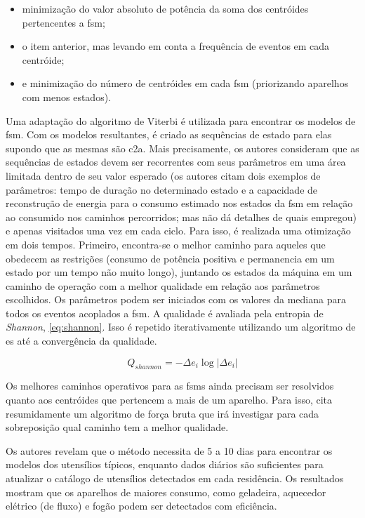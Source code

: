 \begin{enumerate}[label=\textbf{1.\arabic*},wide=\parindent]
\begin{enumerate}[label*=.\textbf{\arabic*},wide=\parindent]
\begin{itemize}[wide=\parindent]
\begin{itemize}
\item minimização do valor absoluto de potência da soma dos
centróides pertencentes a \gls{fsm}; 
\item o item anterior, mas levando em conta a frequência de
eventos em cada centróide; 
\item e minimização do número de centróides em
cada \gls{fsm} (priorizando aparelhos com menos estados).
\end{itemize}

Uma adaptação do algoritmo de Viterbi é utilizada para encontrar os
modelos de \gls{fsm}. Com os modelos resultantes, é criado as
sequências de estado para elas supondo que as mesmas são \gls{c2a}.
Mais precisamente, os autores consideram que as sequências de estados
devem ser recorrentes com seus parâmetros em uma área limitada dentro
de seu valor esperado (os autores citam dois exemplos de parâmetros:
tempo de duração no determinado estado e a capacidade de reconstrução
de energia para o consumo estimado nos estados da \gls{fsm} em relação
ao consumido nos caminhos percorridos; mas não dá detalhes de quais
empregou) e apenas visitados uma vez em cada ciclo. Para isso, é
realizada uma otimização em dois tempos. Primeiro, encontra-se o
melhor caminho para aqueles que obedecem as restrições (consumo de
potência positiva e permanencia em um estado por um tempo não muito
longo), juntando os estados da máquina em um caminho de operação com a
melhor qualidade em relação aos parâmetros escolhidos. Os parâmetros
podem ser iniciados com os valores da mediana para todos os eventos
acoplados a \gls{fsm}. A qualidade é avaliada pela entropia de
\emph{Shannon}, \ref{eq:shannon}. Isso é repetido iterativamente
utilizando um algoritmo de \gls{es} até a convergência da qualidade.

\begin{equation}\label{eq:shannon}
Q_{shannon} = - \Delta{e_{i}} \log{|\Delta{e_{i}}|}
\end{equation}

Os melhores caminhos operativos para as \glspl{fsm} ainda precisam ser
resolvidos quanto aos centróides que pertencem a mais de um aparelho.
Para isso, \cite{nilm_baranski_summary_2004_21} cita resumidamente um
algoritmo de força bruta que irá investigar para cada sobreposição
qual caminho tem a melhor qualidade.

Os autores revelam que o método necessita de 5 a 10 dias para
encontrar os modelos dos utensílios típicos, enquanto dados diários
são suficientes para atualizar o catálogo de utensílios detectados em
cada residência. Os resultados mostram que os aparelhos de maiores
consumo, como geladeira, aquecedor elétrico (de fluxo) e fogão podem
ser detectados com eficiência.


\end{itemize}
\end{enumerate}
\end{enumerate}
